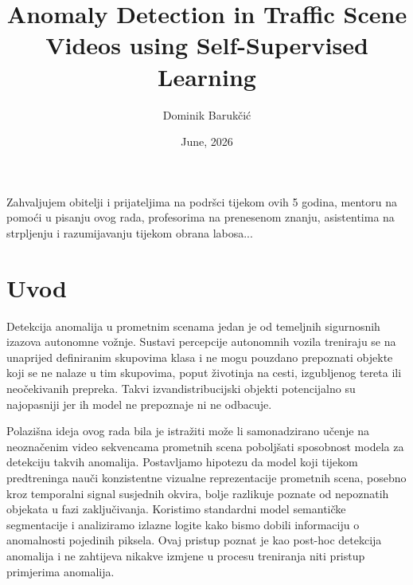 \documentclass[diplomskirad]{fer}
\title{Anomaly Detection in Traffic Scene Videos using Self-Supervised Learning}
\author{Dominik Barukčić}
\date{June, 2026}
\begin{document}
\maketitle






\begin{zahvale}
  Zahvaljujem obitelji i prijateljima na podršci tijekom ovih 5 godina, mentoru na pomoći u pisanju ovog rada, profesorima na prenesenom znanju, asistentima na strpljenju i razumijavanju tijekom obrana labosa... 
\end{zahvale}


\mainmatter


\tableofcontents


\chapter{Uvod}
\label{pog:uvod}

Detekcija anomalija u prometnim scenama jedan je od temeljnih 
sigurnosnih izazova autonomne vožnje. Sustavi percepcije autonomnih 
vozila treniraju se na unaprijed definiranim skupovima klasa i ne 
mogu pouzdano prepoznati objekte koji se ne nalaze u tim skupovima, 
poput životinja na cesti, izgubljenog tereta ili neočekivanih 
prepreka. Takvi izvandistribucijski objekti potencijalno su 
najopasniji jer ih model ne prepoznaje ni ne odbacuje.

Polazišna ideja ovog rada bila je istražiti može li samonadzirano 
učenje na neoznačenim video sekvencama prometnih scena poboljšati 
sposobnost modela za detekciju takvih anomalija. Postavljamo hipotezu 
da model koji tijekom predtreninga nauči konzistentne vizualne 
reprezentacije prometnih scena, posebno kroz temporalni signal 
susjednih okvira, bolje razlikuje poznate od nepoznatih objekata u 
fazi zaključivanja. Koristimo standardni model semantičke segmentacije i 
analiziramo izlazne logite kako bismo dobili informaciju o anomalnosti 
pojedinih piksela. Ovaj pristup poznat je kao post-hoc detekcija 
anomalija i ne zahtijeva nikakve izmjene u procesu treniranja niti 
pristup primjerima anomalija.
\end{document}
